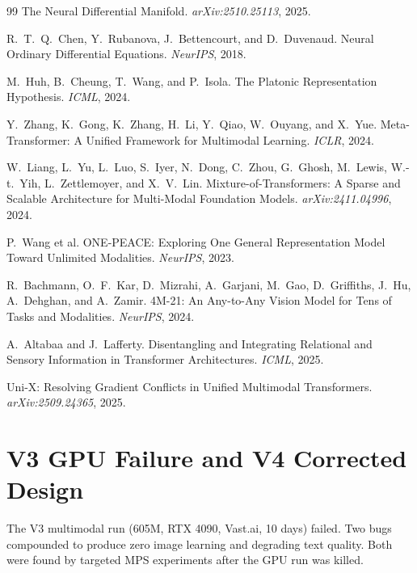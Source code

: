 \documentclass[11pt, a4paper]{article}
\theoremstyle{plain}
\theoremstyle{remark}
\begin{document}
\begin{thebibliography}{99}
The Neural Differential Manifold.
\newblock \emph{arXiv:2510.25113}, 2025.

R.~T.~Q.~Chen, Y.~Rubanova, J.~Bettencourt, and D.~Duvenaud.
\newblock Neural Ordinary Differential Equations.
\newblock \emph{NeurIPS}, 2018.

M.~Huh, B.~Cheung, T.~Wang, and P.~Isola.
\newblock The Platonic Representation Hypothesis.
\newblock \emph{ICML}, 2024.

Y.~Zhang, K.~Gong, K.~Zhang, H.~Li, Y.~Qiao, W.~Ouyang, and X.~Yue.
\newblock Meta-Transformer: A Unified Framework for Multimodal Learning.
\newblock \emph{ICLR}, 2024.

W.~Liang, L.~Yu, L.~Luo, S.~Iyer, N.~Dong, C.~Zhou, G.~Ghosh, M.~Lewis, W.-t.~Yih, L.~Zettlemoyer, and X.~V.~Lin.
\newblock Mixture-of-Transformers: A Sparse and Scalable Architecture for Multi-Modal Foundation Models.
\newblock \emph{arXiv:2411.04996}, 2024.

P.~Wang et al.
\newblock ONE-PEACE: Exploring One General Representation Model Toward Unlimited Modalities.
\newblock \emph{NeurIPS}, 2023.

R.~Bachmann, O.~F.~Kar, D.~Mizrahi, A.~Garjani, M.~Gao, D.~Griffiths, J.~Hu, A.~Dehghan, and A.~Zamir.
\newblock 4M-21: An Any-to-Any Vision Model for Tens of Tasks and Modalities.
\newblock \emph{NeurIPS}, 2024.

A.~Altabaa and J.~Lafferty.
\newblock Disentangling and Integrating Relational and Sensory Information in Transformer Architectures.
\newblock \emph{ICML}, 2025.

Uni-X: Resolving Gradient Conflicts in Unified Multimodal Transformers.
\newblock \emph{arXiv:2509.24365}, 2025.

\end{thebibliography}


\section{V3 GPU Failure and V4 Corrected Design}
\label{sec:v3-failure}

The V3 multimodal run (605M, RTX 4090, Vast.ai, 10 days) failed.
Two bugs compounded to produce zero image learning and degrading text quality.
Both were found by targeted MPS experiments after the GPU run was killed.
\end{document}
